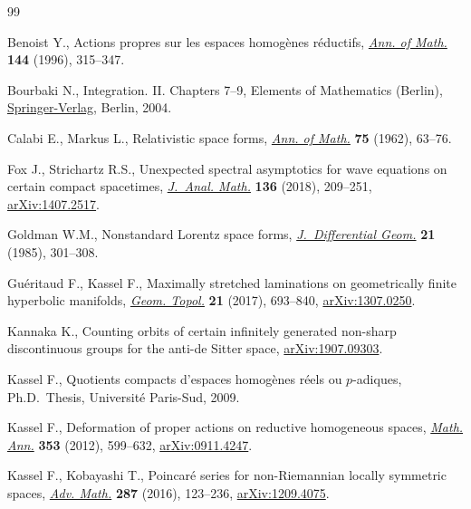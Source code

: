 \documentclass[10pt,a4paper]{amsart}
\numberwithin{equation}{section}
\begin{document}
\begin{thebibliography}{99}
\footnotesize\itemsep=0pt

Benoist Y., Actions propres sur les espaces homog\`enes r\'eductifs,
 \href{https://doi.org/10.2307/2118594}{\textit{Ann. of Math.}} \textbf{144} (1996), 315--347.

Bourbaki N., Integration. {II}. {C}hapters 7--9, Elements of Mathematics
 (Berlin), \href{https://doi.org/10.1007/978-3-662-07931-7}{Springer-Verlag}, Berlin, 2004.

Calabi E., Markus L., Relativistic space forms, \href{https://doi.org/10.2307/1970419}{\textit{Ann. of Math.}}
 \textbf{75} (1962), 63--76.

Fox J., Strichartz R.S., Unexpected spectral asymptotics for wave equations on
 certain compact spacetimes, \href{https://doi.org/10.1007/s11854-018-0059-2}{\textit{J.~Anal. Math.}} \textbf{136} (2018),
 209--251, \href{https://arxiv.org/abs/1407.2517}{arXiv:1407.2517}.

Goldman W.M., Nonstandard {L}orentz space forms, \href{https://doi.org/10.4310/jdg/1214439567}{\textit{J.~Differential Geom.}}
 \textbf{21} (1985), 301--308.

Gu\'eritaud F., Kassel F., Maximally stretched laminations on geometrically
 finite hyperbolic manifolds, \href{https://doi.org/10.2140/gt.2017.21.693}{\textit{Geom. Topol.}} \textbf{21} (2017),
 693--840, \href{https://arxiv.org/abs/1307.0250}{arXiv:1307.0250}.

Kannaka K., Counting orbits of certain infinitely generated non-sharp
 discontinuous groups for the anti-de {S}itter space, \href{https://arxiv.org/abs/1907.09303}{arXiv:1907.09303}.

Kassel F., Quotients compacts d'espaces homog\`enes r\'eels ou $p$-adiques,
 Ph.D.~Thesis, {U}niversit\'e Paris-Sud, 2009.

Kassel F., Deformation of proper actions on reductive homogeneous spaces,
 \href{https://doi.org/10.1007/s00208-011-0672-1}{\textit{Math. Ann.}} \textbf{353} (2012), 599--632, \href{https://arxiv.org/abs/0911.4247}{arXiv:0911.4247}.

Kassel F., Kobayashi T., Poincar\'e series for non-{R}iemannian locally
 symmetric spaces, \href{https://doi.org/10.1016/j.aim.2015.08.029}{\textit{Adv. Math.}} \textbf{287} (2016), 123--236,
 \href{https://arxiv.org/abs/1209.4075}{arXiv:1209.4075}.


\end{thebibliography}
\end{document}
